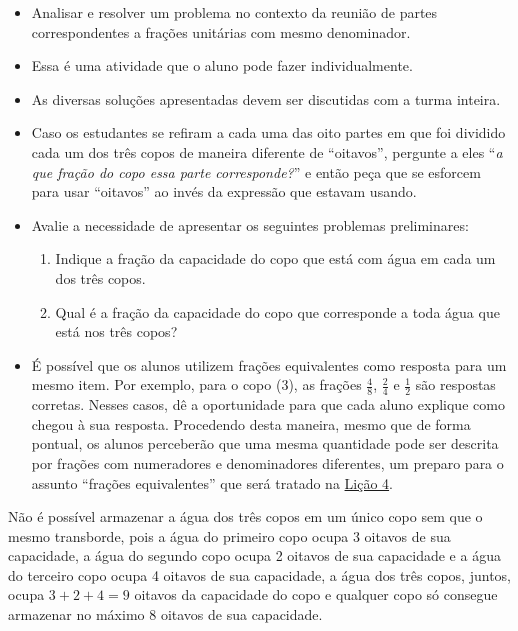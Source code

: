 \begin{atividade}\label{chap2-ativ10}
\objetivos
\begin{itemize} %
    \item       Analisar e resolver um problema no contexto da reunião de partes correspondentes a frações unitárias com mesmo denominador.
\end{itemize} %

\discussoes
    \begin{itemize} %
    \item Essa é uma atividade que o aluno pode fazer individualmente.
    \item As diversas soluções apresentadas devem ser discutidas com a turma inteira.
    \item Caso os estudantes se refiram a cada uma das oito partes em que foi dividido cada um dos três copos de maneira diferente de ``oitavos'', pergunte a eles ``\textit{a que fração do copo essa parte corresponde?}'' e então peça que se esforcem para usar ``oitavos'' ao invés da expressão que estavam usando.
    \item Avalie a necessidade de apresentar os seguintes problemas preliminares:
      \begin{enumerate}
      \item Indique a fração da capacidade do copo que está com água em cada um dos três copos.
      \item Qual é a fração da capacidade do copo que corresponde a toda água que está nos três copos?
      \end{enumerate}
    \item É possível que os alunos utilizem frações equivalentes como resposta para um mesmo item. Por exemplo, para o copo (3), as frações $\frac{4}{8}$, $\frac{2}{4}$ e $\frac{1}{2}$ são respostas corretas. Nesses casos, dê a oportunidade para que cada aluno explique como chegou à sua resposta. Procedendo desta maneira, mesmo que de forma pontual, os alunos perceberão que uma mesma quantidade pode ser descrita por frações com numeradores e denominadores diferentes, um preparo para o assunto ``frações equivalentes'' que será tratado na \hyperref[chap4]{Lição 4}.
\end{itemize} %

\solucao
  Não é possível armazenar a água dos três copos em um único copo sem que o mesmo transborde, pois a água do primeiro copo ocupa 3 oitavos de sua capacidade, a água do segundo copo ocupa 2 oitavos de sua capacidade e a água do terceiro copo ocupa 4 oitavos de sua capacidade, a água dos três copos, juntos, ocupa       $3 + 2 + 4 = 9$ oitavos da capacidade do copo e qualquer copo só consegue armazenar no máximo $8$ oitavos de sua capacidade.


\end{atividade}
